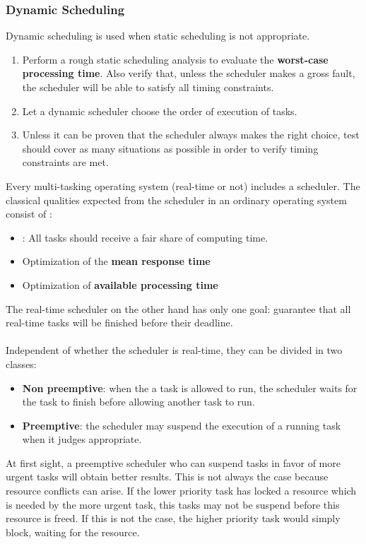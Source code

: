 \documentclass[../main.tex]{subfiles}
\begin{document}
\subsubsection{Dynamic Scheduling}
Dynamic scheduling is used when static scheduling is not appropriate.
\begin{enumerate}
	\item Perform a rough static scheduling analysis to evaluate the \textbf{worst-case processing time}. Also verify that, unless the scheduler makes a gross fault, the scheduler will be able to satisfy all timing constraints.
	\item Let a dynamic scheduler choose the order of execution of tasks.
	\item Unless it can be proven that the scheduler always makes the right choice, test should cover as many situations as possible in order to verify timing constraints are met.
\end{enumerate}

Every multi-tasking operating system (real-time or not) includes a scheduler. The classical qualities expected from the scheduler in an ordinary operating system consist of :
\begin{itemize}
	\item {}: All tasks should receive a fair share of computing time.
	\item Optimization of the \textbf{mean response time}
	\item Optimization of \textbf{available processing time}
\end{itemize}
The real-time scheduler on the other hand has only one goal: guarantee that all real-time tasks will be finished before their deadline.
\\\\
Independent of whether the scheduler is real-time, they can be divided in two classes:
\begin{itemize}
	\item \textbf{Non preemptive}: when the a task is allowed to run, the scheduler waits for the task to finish before allowing another task to run.
	\item \textbf{Preemptive}: the scheduler may suspend the execution of a running task when it judges appropriate.
\end{itemize}

\begin{blockquote}
At first sight, a preemptive scheduler who can suspend tasks in favor of more urgent tasks will obtain better results. This is not always the case because resource conflicts can arise. If  the lower priority task has locked a resource which is needed by the more urgent task, this tasks may not be suspend before this resource is freed. If this is not the case, the higher priority task would simply block, waiting for the resource.
\end{blockquote}
\end{document}
